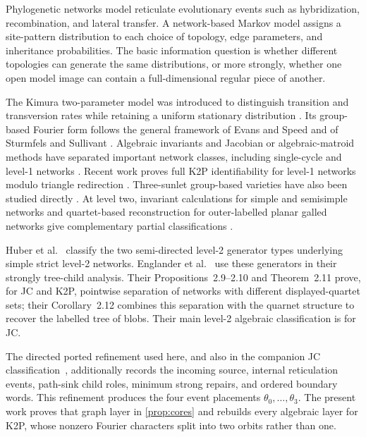 \documentclass[11pt]{article}
\theoremstyle{remark}
\newcommand{\1}{\mathbf 1}
\begin{document}
Phylogenetic networks model reticulate evolutionary events such as
hybridization, recombination, and lateral transfer.  A network-based Markov
model assigns a site-pattern distribution to each choice of topology, edge
parameters, and inheritance probabilities.  The basic information question
is whether different topologies can generate the same distributions, or more
strongly, whether one open model image can contain a full-dimensional regular
piece of another.

The Kimura two-parameter model was introduced to distinguish transition and
transversion rates while retaining a uniform stationary distribution
\cite{Kimura1980}.  Its group-based Fourier form follows the general
framework of Evans and Speed and of Sturmfels and Sullivant
\cite{EvansSpeed1993,SturmfelsSullivant2005}.  Algebraic invariants and
Jacobian or algebraic-matroid methods have separated important network
classes, including single-cycle and level-1 networks
\cite{GrossLong2018,HolleringSullivant2021,GrossEtAl2021}.  Recent work proves
full K2P identifiability for level-1 networks modulo triangle redirection
\cite{BritsEtAl2026}.  Three-sunlet group-based varieties have also been
studied directly \cite{CoxGrossMartin2025}.
At level two, invariant calculations for simple and semisimple networks and
quartet-based reconstruction for outer-labelled planar galled networks give
complementary partial classifications
\cite{Ardiyansyah2021,HoltgrefeEtAl2025Quartets}.

Huber et al.~\cite[Lemma~4.2 and Figure~8]{HuberEtAl2025} classify the two
semi-directed level-2 generator types underlying simple strict level-2
networks.  Englander et al.~\cite{EnglanderEtAl2026} use these generators in
their strongly tree-child analysis.  Their Propositions~2.9--2.10 and
Theorem~2.11 prove, for JC and K2P, pointwise separation of networks with
different displayed-quartet sets; their Corollary~2.12 combines this
separation with the quarnet structure to recover the labelled tree of blobs.
Their main level-2 algebraic classification is for JC.

The directed ported refinement used here, and also in the companion JC
classification~\cite{KriebelJC2026}, additionally records the incoming
source, internal reticulation events, path-sink child roles, minimum strong
repairs, and ordered boundary words.  This refinement produces the four event
placements \(\theta_0,\ldots,\theta_3\).  The present work proves that graph
layer in \cref{prop:cores} and rebuilds every algebraic layer for K2P, whose
nonzero Fourier characters split into two orbits rather than one.
\end{document}
